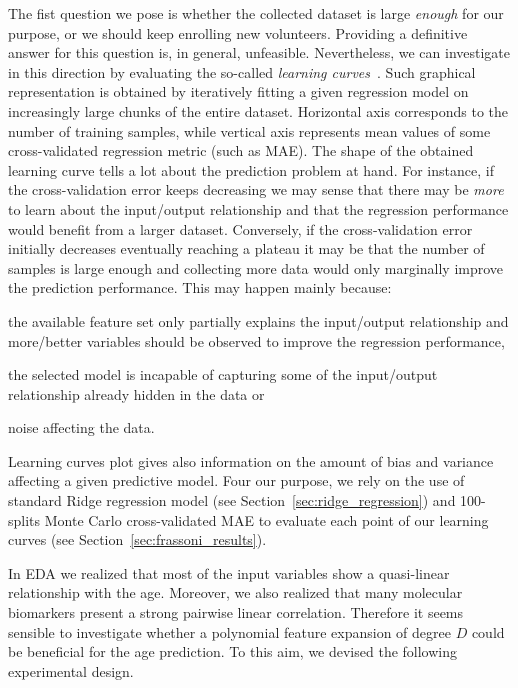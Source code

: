 The fist question we pose is whether the collected dataset is large \textit{enough} for our purpose, or we should keep enrolling new volunteers. Providing a definitive answer for this question is, in general, unfeasible. Nevertheless, we can investigate in this direction by evaluating the so-called \textit{learning curves}~\cite{murphy2012machine}. Such graphical representation is obtained by iteratively fitting a given regression model on increasingly large chunks of the entire dataset.
Horizontal axis corresponds to the number of training samples, while vertical axis represents mean values of some cross-validated regression metric (such as MAE).
The shape of the obtained learning curve tells a lot about the prediction problem at hand. For instance, if the cross-validation error keeps decreasing we may sense that there may be \textit{more} to learn about the input/output relationship and that the regression performance would benefit from a larger dataset. Conversely, if the cross-validation error initially decreases eventually reaching a plateau it may be that the number of samples is large enough and collecting more data would only marginally improve the prediction performance. This may happen mainly because:
\begin{enumerate*}[label=(\roman*)]
	\item the available feature set only partially explains the input/output relationship and more/better variables should be observed to improve the regression performance,
	\item the selected model is incapable of capturing some of the input/output relationship already hidden in the data or
	\item noise affecting the data.
\end{enumerate*}
Learning curves plot gives also information on the amount of bias and variance affecting a given predictive model.
Four our purpose, we rely on the use of standard Ridge regression model (see Section~\ref{sec:ridge_regression}) and 100-splits Monte Carlo cross-validated MAE to evaluate each point of our learning curves (see Section~\ref{sec:frassoni_results}).

In EDA we realized that most of the input variables show a quasi-linear relationship with the age. Moreover, we also realized that many molecular biomarkers present a strong pairwise linear correlation. Therefore it seems sensible to investigate whether a polynomial feature expansion of degree $D$ could be beneficial for the age prediction.
To this aim, we devised the following experimental design.

